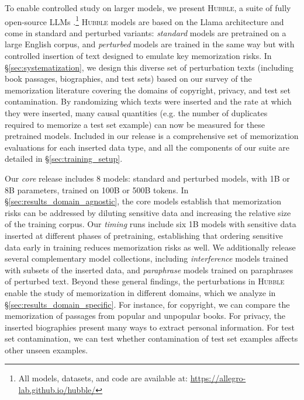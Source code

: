 \documentclass{article} %
\begin{document}
To enable controlled study on larger models, we present \textsc{Hubble}, a suite of fully open-source LLMs \citep[similar to Pythia;][]{DBLP:conf/icml/BidermanSABOHKP23}.\footnote{All models, datasets, and code are available at: \url{https://allegro-lab.github.io/hubble/}} \textsc{Hubble} models are based on the Llama architecture \citep{grattafiori2024llama3herdmodels} and come in standard and perturbed variants: \textit{standard} models are pretrained on a large English corpus, and \textit{perturbed} models are trained in the same way but with controlled insertion of text designed to emulate key memorization risks. In \S\ref{sec:systematization}, we design this diverse set of perturbation texts (including book passages, biographies, and test sets) based on our survey of the memorization literature covering the domains of copyright, privacy, and test set contamination. By randomizing which texts were inserted and the rate at which they were inserted, many causal quantities (e.g. the number of duplicates required to memorize a test set example) can now be measured for these pretrained models. Included in our release is a comprehensive set of memorization evaluations for each inserted data type, and all the components of our suite are detailed in \S\ref{sec:training_setup}.

Our \textit{core} release includes 8 models: standard and perturbed models, with 1B or 8B parameters, trained on 100B or 500B tokens. In \S\ref{sec:results_domain_agnostic}, the core models establish that memorization risks can be addressed by diluting sensitive data and increasing the relative size of the training corpus. Our \textit{timing} runs include six 1B models with sensitive data inserted at different phases of pretraining, establishing that ordering sensitive data early in training reduces memorization risks as well. We additionally release several complementary model collections, including \textit{interference} models trained with subsets of the inserted data, and \textit{paraphrase} models trained on paraphrases of perturbed text. Beyond these general findings, the perturbations in \textsc{Hubble} enable the study of memorization in different domains, which we analyze in \S\ref{sec:results_domain_specific}. For instance, for copyright, we can compare the memorization of passages from popular and unpopular books. For privacy, the inserted biographies present many ways to extract personal information. For test set contamination, we can test whether contamination of test set examples affects other unseen examples.
\end{document}
